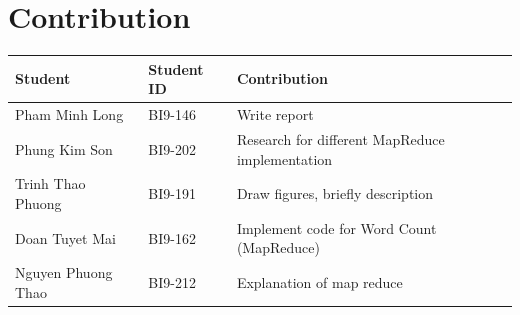 \documentclass[times, 10pt]{thesisMDH}
\begin{document}
\section{Contribution}
\begin{center}
    \begin{tabular}{|l|l|l|}
        \hline
        \textbf{Student} & \textbf{Student ID} & \textbf{Contribution}\\
        \hline
        Pham Minh Long & BI9-146 & Write report\\
        \hline
        Phung Kim Son & BI9-202 & Research for different MapReduce implementation\\
        \hline
        Trinh Thao Phuong & BI9-191 & Draw figures, briefly description \\
        \hline
        Doan Tuyet Mai & BI9-162 & Implement code for Word Count (MapReduce) \\
        \hline
        Nguyen Phuong Thao & BI9-212 & Explanation of map reduce\\
        \hline
    \end{tabular}
\end{center}
\end{document}
